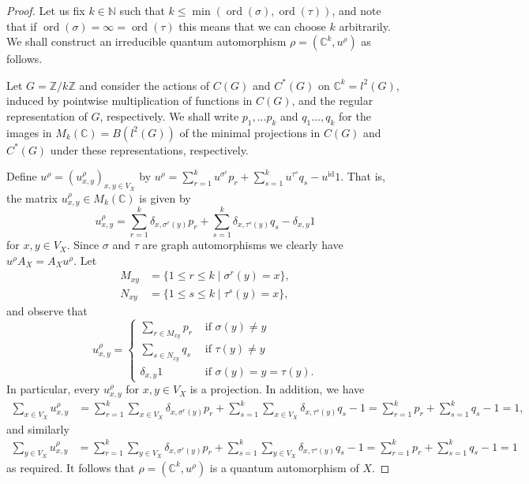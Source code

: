 \documentclass[a4paper]{amsart}
\DeclareMathOperator{\id}{id}
\DeclareMathOperator{\ord}{ord}
\numberwithin{equation}{section}
\theoremstyle{change}
\begin{document}
\begin{proof} 
Let us fix $ k \in \mathbb{N} $ such that $ k \leq \min(\ord(\sigma), \ord(\tau)) $, and note that if $ \ord(\sigma) = \infty = \ord(\tau) $ this means that we can 
choose $ k $ arbitrarily. We shall construct an irreducible quantum automorphism $ \rho = (\mathbb{C}^k, u^\rho) $ as follows. 

Let $ G = \mathbb{Z}/k\mathbb{Z} $ and consider the actions of $ C(G) $ and $ C^*(G) $ on $ \mathbb{C}^k = l^2(G) $, induced by pointwise multiplication of functions in $ C(G) $, 
and the regular representation of $ G $, respectively. We shall write $ p_1, \dots p_k $ and $ q_1 \dots, q_k $ for the images in $ M_k(\mathbb{C}) = B(l^2(G)) $ of the minimal 
projections in $ C(G) $ and $ C^*(G) $ under these representations, respectively. 
 
Define $ u^\rho = (u^\rho_{x,y})_{x,y \in V_X} $ by $ u^\rho = \sum_{r = 1}^k u^{\sigma^r} p_r + \sum_{s = 1}^k u^{\tau^s} q_s - u^{\id} 1 $. That 
is, the matrix $ u^\rho_{x,y} \in M_k(\mathbb{C}) $ is given by 
$$ 
u^\rho_{x,y} = \sum_{r = 1}^k \delta_{x,\sigma^r(y)} p_r + \sum_{s = 1}^k \delta_{x,\tau^s(y)} q_s - \delta_{x,y} 1
$$ 
for $ x, y \in V_X $. 
Since $ \sigma $ and $ \tau $ are graph automorphisms we clearly have $ u^\rho A_X = A_X u^\rho $. Let 
\begin{align*}
M_{xy} &= \{1 \leq r \leq k \mid \sigma^r(y) = x \}, \\
N_{xy} &= \{1 \leq s \leq k \mid \tau^s(y) = x \}, 
\end{align*}
and observe that 
$$ 
u^\rho_{x,y} = 
\begin{cases} 
\sum_{r \in M_{xy}} p_r & \text{ if } \sigma(y) \neq y  \\
\sum_{s \in N_{xy}} q_s & \text{ if } \tau(y) \neq y  \\
\delta_{x,y} 1 & \text{ if } \sigma(y) = y = \tau(y). 
\end{cases}
$$
In particular, every $ u^\rho_{x,y} $ for $ x, y \in V_X $ is a projection. In addition, we have 
\begin{align*}
\sum_{x \in V_X} u^\rho_{x,y} &= \sum_{r = 1}^k \sum_{x \in V_X} \delta_{x, \sigma^r(y)} p_r + \sum_{s = 1}^k \sum_{x \in V_X} \delta_{x, \tau^s(y)} q_s - 1
= \sum_{r = 1}^k  p_r + \sum_{s = 1}^k q_s - 1 = 1,  
\end{align*}
and similarly 
\begin{align*}
\sum_{y \in V_X} u^\rho_{x,y} &= \sum_{r = 1}^k \sum_{y \in V_X} \delta_{x,\sigma^r(y)} p_r + \sum_{s = 1}^k \sum_{y \in V_X} \delta_{x,\tau^s(y)} q_s - 1 
= \sum_{r = 1}^k p_r + \sum_{s = 1}^k q_s - 1 = 1 
\end{align*}
as required. It follows that $ \rho = (\mathbb{C}^k, u^\rho) $ is a quantum automorphism of $ X $. 


\end{proof}
\end{document}
